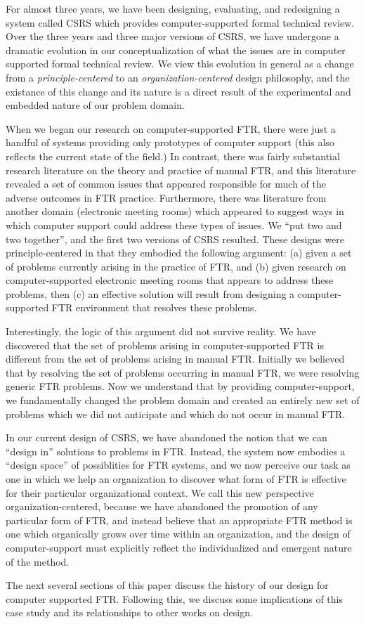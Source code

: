 For almost three years, we have been designing, evaluating, and redesigning
a system called CSRS which provides computer-supported formal technical
review.  Over the three years and three major versions of CSRS, we have
undergone a dramatic evolution in our conceptualization of what the issues
are in computer supported formal technical review.  We view this evolution
in general as a change from a {\em principle-centered} to an {\em
organization-centered} design philosophy, and the existance of this change
and its nature is a direct result of the experimental and embedded nature
of our problem domain.

When we began our research on computer-supported FTR, there were just a
handful of systems providing only prototypes of computer support (this also
reflects the current state of the field.)  In contrast, there was fairly
substantial research literature on the theory and practice of manual FTR,
and this literature revealed a set of common issues that appeared
responsible for much of the adverse outcomes in FTR practice.  Furthermore,
there was literature from another domain (electronic meeting rooms) which
appeared to suggest ways in which computer support could address these
types of issues.  We ``put two and two together'', and the first two
versions of CSRS resulted.  These designs were principle-centered in that they
embodied the following argument: (a) given a set of problems currently arising in
the practice of FTR, and (b) given research on computer-supported electronic
meeting rooms that appears to address these problems, then (c) an effective
solution will result from designing a computer-supported FTR environment
that resolves these problems.

Interestingly, the logic of this argument did not survive reality.  We have
discovered that the set of problems arising in computer-supported FTR is
different from the set of problems arising in manual FTR.  Initially we
believed that by resolving the set of problems occurring in manual FTR, we
were resolving generic FTR problems.  Now we understand that by providing
computer-support, we fundamentally changed the problem domain and created
an entirely new set of problems which we did not anticipate and which do
not occur in manual FTR.

In our current design of CSRS, we have abandoned the notion that we can
``design in'' solutions to problems in FTR.  Instead, the system now
embodies a ``design space'' of possiblities for FTR systems, and we now
perceive our task as one in which we help an organization to discover what
form of FTR is effective for their particular organizational context.  We
call this new perspective organization-centered, because we have abandoned
the promotion of any particular form of FTR, and instead believe that an
appropriate FTR method is one which organically grows over time within an
organization, and the design of computer-support must explicitly reflect
the individualized and emergent nature of the method.

The next several sections of this paper discuss the history of our design
for computer supported FTR.  Following this, we discuss some implications
of this case study and its relationships to other works on design.









 


